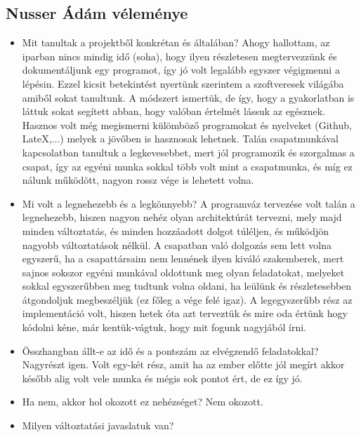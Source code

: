 \subsection{Nusser Ádám véleménye}
\begin{itemize}
\item Mit tanultak a projektből konkrétan és általában?\newline
	Ahogy hallottam, az iparban nincs mindig idő (soha), hogy ilyen részletesen megtervezzünk és dokumentáljunk egy programot, így jó volt legalább egyszer végigmenni a lépésin. Ezzel kicsit betekintést nyertünk szerintem a szoftveresek világába amiből sokat tanultunk. A módszert ismertük, de így, hogy a gyakorlatban is láttuk sokat segített abban, hogy valóban értelmét lássuk az egésznek. Hasznos volt még megismerni külömböző programokat és nyelveket (Github, LateX,...) melyek a jövőben is hasznosak lehetnek.
\newline Talán csapatmunkával kapcsolatban tanultuk a legkevesebbet, mert jól programozik és szorgalmas a csapat, így az egyéni munka sokkal több volt mint a csapatmunka, és míg ez nálunk működött, nagyon rossz vége is lehetett volna.
\item Mi volt a legnehezebb és a legkönnyebb? \newline
	A programváz tervezése volt talán a legnehezebb, hiszen nagyon nehéz olyan architektúrát tervezni, mely majd minden változtatás, és minden hozzáadott dolgot túléljen, és működjön nagyobb változtatások nélkül. A csapatban való dolgozás sem lett volna egyszerű, ha a csapattársaim nem lennének ilyen kiváló szakemberek, mert sajnos sokszor egyéni munkával oldottunk meg olyan feladatokat, melyeket sokkal egyszerűbben meg tudtunk volna oldani, ha leülünk és részletesebben átgondoljuk megbeszéljük (ez főleg a vége felé igaz).
\newline A legegyszerűbb rész az implementáció volt, hiszen hetek óta azt terveztük és mire oda értünk hogy kódolni kéne, már kentük-vágtuk, hogy mit fogunk nagyjából írni.
\item Összhangban állt-e az idő és a pontszám az elvégzendő feladatokkal? \newline
	Nagyrészt igen. Volt egy-két rész, amit ha az ember előtte jól megírt akkor később alig volt vele munka és mégis sok pontot ért, de ez így jó.
\item Ha nem, akkor hol okozott ez nehézséget? \newline
	Nem okozott.
\item Milyen változtatási javaslatuk van? \newline

\end{itemize}
